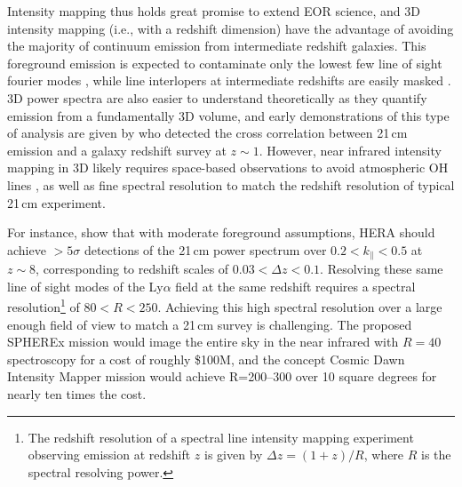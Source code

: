 \documentclass[numberedappendix]{emulateapj}
\begin{document}
Intensity mapping thus holds great promise to extend EOR science, and 3D intensity mapping (i.e., with a redshift dimension) have the advantage of avoiding the majority of continuum emission from intermediate redshift galaxies. This foreground emission is expected to contaminate only the lowest few line of sight fourier modes \citep{gong17}, while line interlopers at intermediate redshifts are easily masked \citep{Gong2014,gong17,pullen14,Comaschi16}. 3D power spectra are also easier to understand theoretically as they quantify emission from a fundamentally 3D volume, and early demonstrations of this type of analysis are given by \citet{Chang2010,Masui2013} who detected the cross correlation between 21\,cm emission and a galaxy redshift survey at $z\sim1$. However, near infrared intensity mapping in 3D likely requires space-based observations to avoid atmospheric OH lines \citep[e.g.][]{sullivan12}, as well as fine spectral resolution to match the redshift resolution of typical 21\,cm experiment. 

For instance, \citet{PoberNextGen} show that with moderate foreground assumptions, HERA should achieve $>5\sigma$ detections of the 21\,cm power spectrum 	over $0.2<k_\parallel<0.5$ at $z\sim8$, corresponding to redshift scales of $0.03<\Delta z<0.1$. Resolving these same line of sight modes of the Ly$\alpha$ field at the same redshift requires a spectral resolution\footnote{The redshift resolution of a spectral line intensity mapping experiment observing emission at redshift $z$ is given by $\Delta z=(1+z)/R$, where $R$ is the spectral resolving power.} of $80<R<250$. Achieving this high spectral resolution over a large enough field of view to match a 21\,cm survey is challenging. The proposed SPHEREx mission \citep{ScienceWithSpherex,SpherexWhitePaper} would image the entire sky in the near infrared with $R=40$ spectroscopy for a cost of roughly \$100M, and the concept Cosmic Dawn Intensity Mapper \citep{cooray16} mission would achieve R=200--300 over 10 square degrees for nearly ten times the cost.
\end{document}
